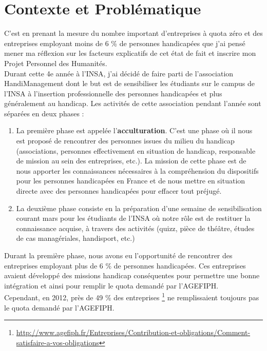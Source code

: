 \section{Contexte et Problématique}
C'est en prenant la mesure du nombre important d'entreprises à quota zéro et  des entreprises employant moins de 6 \% de personnes handicapées que j'ai pensé mener ma réflexion sur les facteurs explicatifs de cet état de fait et inscrire mon Projet Personnel des Humanités. \\

Durant cette 4e année à l'INSA, j'ai décidé de faire parti de l'association HandiManagement dont le but est de sensibiliser les étudiants sur le campus de l'INSA à l'insertion professionnelle des personnes handicapées et plus généralement au handicap. Les activités de cette association pendant l'année sont séparées en deux phases :
\begin{enumerate}
\item La première phase est appelée l'\textbf{acculturation}. C'est une phase où il nous est proposé de rencontrer des personnes issues du milieu du handicap (associations, personnes effectivement en situation de handicap, responsable de mission au sein des entreprises, etc.). La mission de cette phase est de nous apporter les connaissances nécessaires à la compréhension du dispositifs pour les personnes handicapées en France et de nous mettre en situation directe avec des personnes handicapées pour effacer tout préjugé.
\item La deuxième phase consiste en la préparation d'une semaine de sensibilisation courant mars pour les étudiants de l'INSA où notre r\^ole est de restituer la connaissance acquise, à travers des activités (quizz, pièce de thé\^atre, études de cas managériales, handisport, etc.)\\
\end{enumerate}

Durant la première phase, nous avons eu l'opportunité de rencontrer des entreprises employant plus de 6 \% de personnes handicapées. Ces entreprises avaient développé des missions handicap conséquentes pour permettre une bonne intégration et ainsi pour remplir le quota demandé par l'AGEFIPH.\\

Cependant, en 2012, près de 49 \% des entreprises \footnote{\url{http://www.agefiph.fr/Entreprises/Contribution-et-obligations/Comment-satisfaire-a-vos-obligations}} ne remplissaient toujours pas le quota demandé par l'AGEFIPH.\\

